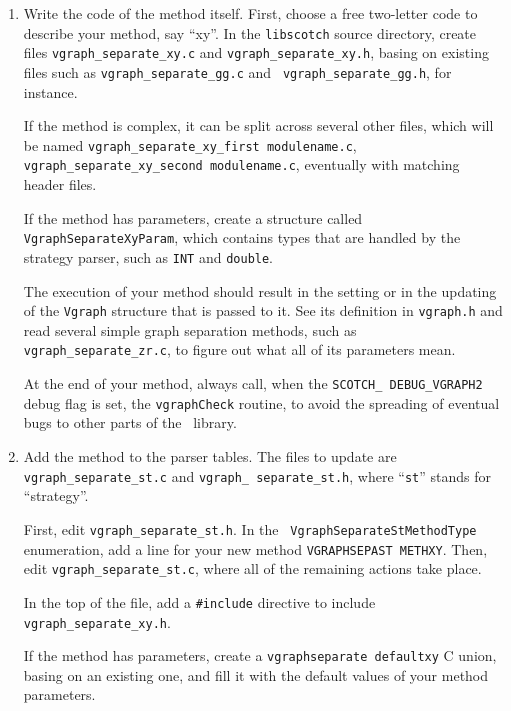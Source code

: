 \begin{enumerate}
\item
Write the code of the method itself. First, choose a free two-letter
code to describe your method, say ``xy''. In the {\tt libscotch}
source directory, create files {\tt vgraph\_\lbt separate\_\lbt xy.c}
and {\tt vgraph\_\lbt separate\_\lbt xy.h}, basing on existing
files such as {\tt vgraph\_\lbt separate\_\lbt gg.c} and {\tt
vgraph\_\lbt separate\_\lbt gg.h}, for instance.

If the method is complex, it can be split across several other files,
which will be named {\tt vgraph\_\lbt separate\_\lbt xy\_\lbt first\lbt
module\lbt name.c}, {\tt vgraph\_\lbt separate\_\lbt xy\_\lbt second\lbt
module\lbt name.c}, eventually with matching header files.

If the method has parameters, create a structure called {\tt
Vgraph\lbt Separate\lbt Xy\lbt Param}, which contains types that
are handled by the strategy parser, such as {\tt INT} and
{\tt double}.

The execution of your method should result in the setting or in the
updating of the {\tt Vgraph} structure that is passed to it. See its
definition in {\tt vgraph.h} and read several simple graph separation
methods, such as {\tt vgraph\_\lbt separate\_\lbt zr.c}, to figure out
what all of its parameters mean.

At the end of your method, always call, when the {\tt SCOTCH\_\lbt
DEBUG\_\lbt VGRAPH2} debug flag is set, the {\tt vgraph\lbt Check}
routine, to avoid the spreading of eventual bugs to other parts of
the \libscotch\ library.
\item
Add the method to the parser tables. The files to update are
{\tt vgraph\_\lbt separate\_\lbt st.c} and {\tt vgraph\_\lbt
separate\_\lbt st.h}, where ``{\tt st}'' stands for ``strategy''.

First, edit {\tt vgraph\_\lbt separate\_\lbt st.h}. In the {\tt
Vgraph\lbt Separate\lbt St\lbt Method\lbt Type} enumeration,
add a line for your new method {\tt VGRAPH\lbt SEPA\lbt ST\lbt
METH\lbt XY}. Then, edit {\tt vgraph\_\lbt separate\_\lbt st.c},
where all of the remaining actions take place.

In the top of the file, add a {\tt \#include} directive to include
{\tt vgraph\_\lbt separate\_\lbt xy.h}.

If the method has parameters, create a {\tt vgraph\lbt separate\lbt
default\lbt xy} C union, basing on an existing one, and fill it with
the default values of your method parameters.


\end{enumerate}
